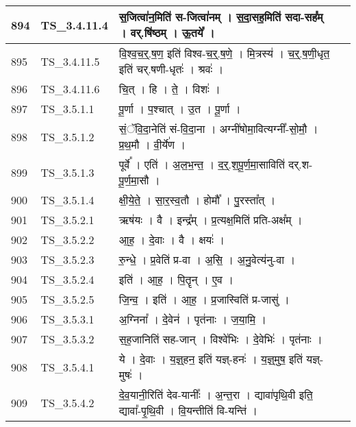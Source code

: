 \documentclass[17pt]{extarticle}
\begin{document}
\begin{longtable}{||p{0.4in}||p{0.9in}||p{4.0in}||p{0.9in}||}
            894 & TS\_3.4.11.4 & स॒जित्वा॑न॒मिति॑ स{-}जित्वा॑नम्   ।   स॒दा॒सह॒मिति॑ सदा{-}सह᳚म्   ।   वर्.षि॑ष्ठम्   ।   ऊ॒तये᳚   ।    &      \\
        \hline
            895 & TS\_3.4.11.5 & वि॒श्व॒च॒र्॒.ष॒ण॒ इति॑ विश्व{-}च॒र्॒.ष॒णे॒   ।   मि॒त्रस्य॑   ।   च॒र्॒.ष॒णी॒धृत॒ इति॑ चर्.षणी{-}धृतः॑   ।   श्रवः॑   ।    &      \\
        \hline
            896 & TS\_3.4.11.6 & चि॒त्   ।   हि   ।   ते॒   ।   विशः॑   ।    &      \\
        \hline
            897 & TS\_3.5.1.1 & पू॒र्णा   ।   प॒श्चात्   ।   उ॒त   ।   पू॒र्णा   ।    &      \\
        \hline
            898 & TS\_3.5.1.2 & सं॒ॅवि॒दा॒नेति॑ सं{-}वि॒दा॒ना   ।   अग्नी॑षोमा॒वित्यग्नी᳚{-}सो॒मौ॒   ।   प्र॒थ॒मौ   ।   वी॒र्ये॑ण   ।    &      \\
        \hline
            899 & TS\_3.5.1.3 & पूर्वे᳚   ।   एति॑   ।   अ॒ल॒भ॒न्त॒   ।   द॒र्॒.श॒पू॒र्ण॒मा॒साविति॑ दर्.श{-}पू॒र्ण॒मा॒सौ   ।    &      \\
        \hline
            900 & TS\_3.5.1.4 & क्षी॒ये॒ते॒   ।   सा॒र॒स्व॒तौ   ।   होमौ᳚   ।   पु॒रस्ता᳚त्   ।    &      \\
        \hline
            901 & TS\_3.5.2.1 & ऋष॑यः   ।   वै   ।   इन्द्र᳚म्   ।   प्र॒त्यक्ष॒मिति॑ प्रति{-}अक्ष᳚म्   ।    &      \\
        \hline
            902 & TS\_3.5.2.2 & आ॒ह॒   ।   दे॒वाः   ।   वै   ।   क्षयः॑   ।    &      \\
        \hline
            903 & TS\_3.5.2.3 & रु॒न्धे॒   ।   प्र॒वेति॑ प्र{-}वा   ।   अ॒सि॒   ।   अ॒नु॒वेत्य॑नु{-}वा   ।    &      \\
        \hline
            904 & TS\_3.5.2.4 & इति॑   ।   आ॒ह॒   ।   पि॒तॄन्   ।   ए॒व   ।    &      \\
        \hline
            905 & TS\_3.5.2.5 & जि॒न्व॒   ।   इति॑   ।   आ॒ह॒   ।   प्र॒जास्विति॑ प्र{-}जासु॑   ।    &      \\
        \hline
            906 & TS\_3.5.3.1 & अ॒ग्निना᳚   ।   दे॒वेन॑   ।   पृत॑नाः   ।   ज॒या॒मि॒   ।    &      \\
        \hline
            907 & TS\_3.5.3.2 & स॒ह॒जानिति॑ सह{-}जान्   ।   विश्वे॑भिः   ।   दे॒वेभिः॑   ।   पृत॑नाः   ।    &      \\
        \hline
            908 & TS\_3.5.4.1 & ये   ।   दे॒वाः   ।   य॒ज्ञ्॒हन॒ इति॑ यज्ञ्{-}हनः॑   ।   य॒ज्ञ्॒मुष॒ इति॑ यज्ञ्{-}मुषः॑   ।    &      \\
        \hline
            909 & TS\_3.5.4.2 & दे॒व॒यानी॒रिति॑ देव{-}यानीः᳚   ।   अ॒न्त॒रा   ।   द्यावा॑पृथि॒वी इति॒ द्यावा᳚{-}पृ॒थि॒वी   ।   वि॒यन्तीति॑ वि{-}यन्ति॑   ।    &      \\

\end{longtable}
\end{document}
